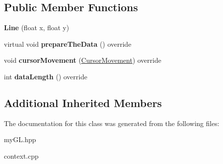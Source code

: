 \subsection*{Public Member Functions}
\begin{DoxyCompactItemize}
\item 
\hypertarget{classLine_af86eb752cf0f65bd28b3c7f498862a26}{}{\bfseries Line} (float x, float y)\label{classLine_af86eb752cf0f65bd28b3c7f498862a26}

\item 
\hypertarget{classLine_a344075dff1d956c5a1efe077c775c814}{}virtual void {\bfseries prepare\+The\+Data} () override\label{classLine_a344075dff1d956c5a1efe077c775c814}

\item 
\hypertarget{classLine_a5eda78277ddb35bc5b34035767e4a063}{}void {\bfseries cursor\+Movement} (\hyperlink{classCursorMovement}{Cursor\+Movement}) override\label{classLine_a5eda78277ddb35bc5b34035767e4a063}

\item 
\hypertarget{classLine_a9d6011bc5bfaa1398b6c84b878d4c391}{}int {\bfseries data\+Length} () override\label{classLine_a9d6011bc5bfaa1398b6c84b878d4c391}

\end{DoxyCompactItemize}
\subsection*{Additional Inherited Members}


The documentation for this class was generated from the following files\+:\begin{DoxyCompactItemize}
\item 
my\+G\+L.\+hpp\item 
context.\+cpp\end{DoxyCompactItemize}
